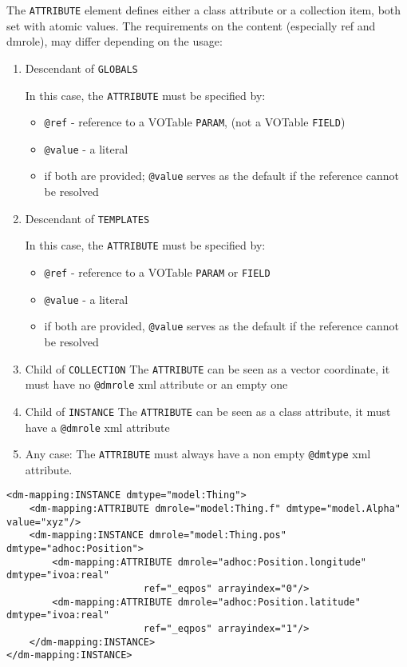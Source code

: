 
The \texttt{ATTRIBUTE} element defines either a class attribute or a collection item, both set with atomic values.
The requirements on
the content (especially ref and dmrole), may differ depending on
the usage:


\begin{enumerate}
\item Descendant of \texttt{GLOBALS}

In this case, the \texttt{ATTRIBUTE} must be specified by:
  \begin{itemize} 
      \item \texttt{@ref} - reference to a VOTable \texttt{PARAM}, 
      (not a VOTable \texttt{FIELD})
      \item \texttt{@value} - a literal
      \item  if both are provided; \texttt{@value} serves as the default 
      if the reference cannot be resolved
  \end{itemize}  

  
\item Descendant of \texttt{TEMPLATES} 

In this case, the \texttt{ATTRIBUTE} must be specified by:
  \begin{itemize} 
      \item \texttt{@ref} - reference to a VOTable \texttt{PARAM} 
      or \texttt{FIELD}
      \item \texttt{@value} - a literal
      \item if both are provided, \texttt{@value} serves as the default if 
      the reference cannot be resolved
  \end{itemize}  

\item Child of \texttt{COLLECTION} 
    The \texttt{ATTRIBUTE} can be seen as a vector coordinate, 
    it must have  no \texttt{@dmrole} xml attribute or an empty one
    
\item Child of \texttt{INSTANCE}  
    The \texttt{ATTRIBUTE} can be seen as a class attribute, 
    it must have a \texttt{@dmrole} xml attribute
           
\item Any case:     
    The \texttt{ATTRIBUTE} must always have a non empty \texttt{@dmtype} xml attribute.
\end{enumerate}  
    
    
\begin{lstlisting}[frame=single,caption={ATTRIBUTE examples},style=XML,basicstyle=\tiny]
<dm-mapping:INSTANCE dmtype="model:Thing">
    <dm-mapping:ATTRIBUTE dmrole="model:Thing.f" dmtype="model.Alpha" value="xyz"/>		
    <dm-mapping:INSTANCE dmrole="model:Thing.pos" dmtype="adhoc:Position">
        <dm-mapping:ATTRIBUTE dmrole="adhoc:Position.longitude" dmtype="ivoa:real" 
                        ref="_eqpos" arrayindex="0"/>
        <dm-mapping:ATTRIBUTE dmrole="adhoc:Position.latitude" dmtype="ivoa:real" 
                        ref="_eqpos" arrayindex="1"/>
    </dm-mapping:INSTANCE>
</dm-mapping:INSTANCE>
\end{lstlisting}  


